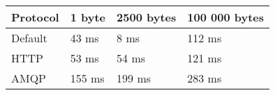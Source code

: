\begin{tabularx}{\textwidth}{llll}
\hline
 Protocol   & 1 byte   & 2500 bytes   & 100 000 bytes   \\
\hline
 Default    & 43 ms    & 8 ms         & 112 ms          \\
 HTTP       & 53 ms    & 54 ms        & 121 ms          \\
 AMQP       & 155 ms   & 199 ms       & 283 ms          \\
\hline
\end{tabularx}